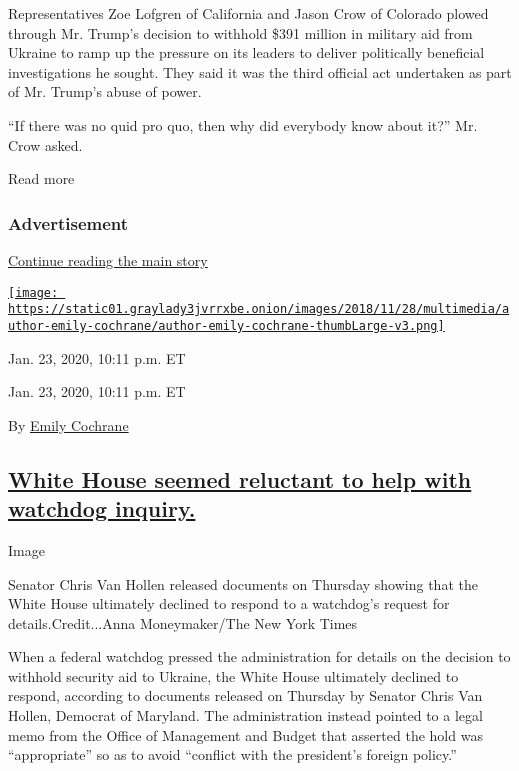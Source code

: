 Representatives Zoe Lofgren of California and Jason Crow of Colorado
plowed through Mr. Trump's decision to withhold \$391 million in
military aid from Ukraine to ramp up the pressure on its leaders to
deliver politically beneficial investigations he sought. They said it
was the third official act undertaken as part of Mr. Trump's abuse of
power.

``If there was no quid pro quo, then why did everybody know about it?''
Mr. Crow asked.

Read more

\hypertarget{advertisement}{%
\subsubsection{Advertisement}\label{advertisement}}

\protect\hyperlink{after-dfp-ad-mid1}{Continue reading the main story}

\href{https://www.nytimes3xbfgragh.onion/by/emily-cochrane}{\texttt{[image: https://static01.graylady3jvrrxbe.onion/images/2018/11/28/multimedia/author-emily-cochrane/author-emily-cochrane-thumbLarge-v3.png]}}

Jan. 23, 2020, 10:11 p.m. ET

Jan. 23, 2020, 10:11 p.m. ET

By \href{https://www.nytimes3xbfgragh.onion/by/emily-cochrane}{Emily
Cochrane}

\hypertarget{white-house-seemed-reluctant-to-help-with-watchdog-inquiry}{%
\subsection{\texorpdfstring{\protect\hyperlink{white-house-watchdog-inquiry}{White
House seemed reluctant to help with watchdog
inquiry.}}{White House seemed reluctant to help with watchdog inquiry.}}\label{white-house-seemed-reluctant-to-help-with-watchdog-inquiry}}

Image

Senator Chris Van Hollen released documents on Thursday showing that the
White House ultimately declined to respond to a watchdog's request for
details.Credit...Anna Moneymaker/The New York Times

When a federal watchdog pressed the administration for details on the
decision to withhold security aid to Ukraine, the White House ultimately
declined to respond, according to documents released on Thursday by
Senator Chris Van Hollen, Democrat of Maryland. The administration
instead pointed to a legal memo from the Office of Management and Budget
that asserted the hold was ``appropriate'' so as to avoid ``conflict
with the president's foreign policy.''

